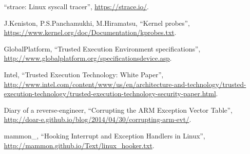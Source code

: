 \begin{thebibliography}{99}
``strace: Linux syscall tracer'',
\url{https://strace.io/}.

J.Keniston, P.S.Panchamukhi, M.Hiramatsu,
``Kernel probes'',
\url{https://www.kernel.org/doc/Documentation/kprobes.txt}.

GlobalPlatform,
``Trusted Execution Environment specifications'',
\url{http://www.globalplatform.org/specificationsdevice.asp}.

Intel,
``Trusted Execution Technology: White Paper'',
\url{http://www.intel.com/content/www/us/en/architecture-and-technology/trusted-execution-technology/trusted-execution-technology-security-paper.html}.

Diary of a reverse-engineer,
``Corrupting the ARM Exception Vector Table'',
\url{http://doar-e.github.io/blog/2014/04/30/corrupting-arm-evt/}.

mammon\_,
``Hooking Interrupt and Exception Handlers in Linux'',
\url{http://mammon.github.io/Text/linux_hooker.txt}.

\end{thebibliography}
